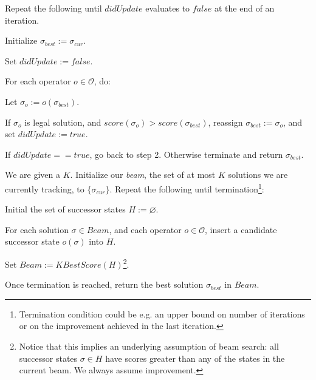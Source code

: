 \documentclass[11pt]{article}
\begin{document}
\begin{algorithm}
	Repeat the following until $didUpdate$ evaluates to $false$ at the end of an iteration.
	\begin{compactenum}
		\item Initialize $\sigma_{best} := \sigma_{cur}$.
		
		\item Set $didUpdate := false$.
		
		\item For each operator $o \in \mathcal{O}$, do:
		\begin{compactenum}
			\item Let $\sigma_{o} := o(\sigma_{best})$. 
			
			\item If $\sigma_{o}$ is legal solution, and $score(\sigma_{o}) > score(\sigma_{best})$, reassign $\sigma_{best} := \sigma_{o}$, and set $didUpdate := true$. 
		\end{compactenum}
		
		\item If $didUpdate == true$, go back to step 2. Otherwise terminate and return $\sigma_{best}$. 
	\end{compactenum}
\end{algorithm}

\begin{algorithm}
	We are given a  $K$. Initialize our \textit{beam}, the set of at most $K$ solutions we are currently tracking, to $\{\sigma_{cur}\}$. Repeat the following until termination\footnote{Termination condition could be e.g. an upper bound on number of iterations or on the improvement achieved in the last iteration.}:
	\begin{compactenum}
		\item Initial the set of successor states $H := \varnothing$. 
		
		\item For each solution $\sigma \in Beam$, and each operator $o \in \mathcal{O}$, insert a candidate successor state $o(\sigma)$ into $H$. 
		
		\item Set $Beam := KBestScore(H)$\footnote{Notice that this implies an underlying assumption of beam search: all successor states $\sigma \in H$ have scores greater than any of the states in the current beam. We always assume improvement.}.
	\end{compactenum}
	Once termination is reached, return the best solution $\sigma_{best}$ in $Beam$. 
\end{algorithm}
\end{document}
